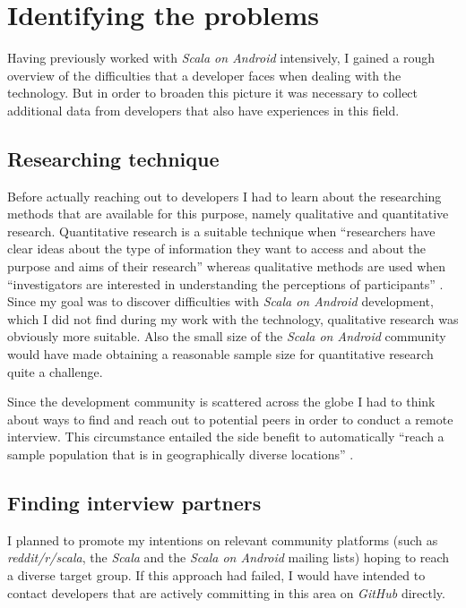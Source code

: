 \section{Identifying the problems}

Having previously worked with \textit{Scala on Android} intensively, I gained a rough overview of the difficulties that a developer faces when dealing with the technology. But in order to broaden this picture it was necessary to collect additional data from developers that also have experiences in this field.

\subsection{Researching technique}

Before actually reaching out to developers I had to learn about the researching methods that are available for this purpose, namely qualitative and quantitative research. Quantitative research is a suitable technique when \enquote{researchers have clear ideas about the type of information they want to access and about the purpose and aims of their research} \cite[p. 72]{berg01} whereas qualitative methods are used when \enquote{investigators are interested in understanding the perceptions of participants} \cite[p. 72]{berg01}. Since my goal was to discover difficulties with \textit{Scala on Android} development, which I did not find during my work with the technology, qualitative research was obviously more suitable. Also the small size of the \textit{Scala on Android} community would have made obtaining a reasonable sample size for quantitative research quite a challenge.

Since the development community is scattered across the globe I had to think about ways to find and reach out to potential peers in order to conduct a remote interview. This circumstance entailed the side benefit to automatically \enquote{reach a sample population that is in geographically diverse locations} \cite[p. 82]{berg01}.

\subsection{Finding interview partners}

I planned to promote my intentions on relevant community platforms (such as \textit{reddit/r/scala}, the \textit{Scala} and the \textit{Scala on Android} mailing lists) hoping to reach a diverse target group. If this approach had failed, I would have intended to contact developers that are actively committing in this area on \textit{GitHub} directly.

